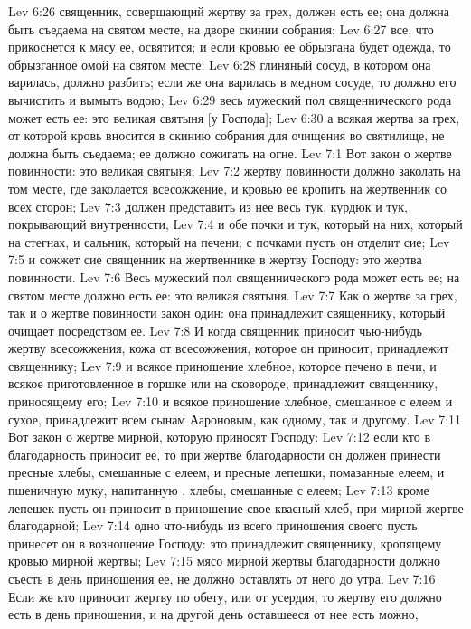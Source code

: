 \vs Lev 6:26 священник, совершающий жертву за грех, должен есть ее; она должна быть съедаема на святом месте, на дворе скинии собрания;
\vs Lev 6:27 все, что прикоснется к мясу ее, освятится; и если кровью ее обрызгана будет одежда, то обрызганное омой на святом месте;
\vs Lev 6:28 глиняный сосуд, в котором она варилась, должно разбить; если же она варилась в медном сосуде, то должно его вычистить и вымыть водою;
\vs Lev 6:29 весь мужеский пол священнического рода может есть ее: это великая святыня [у Господа];
\vs Lev 6:30 а всякая жертва за грех, от которой кровь вносится в скинию собрания для очищения во святилище, не должна быть съедаема; ее должно сожигать на огне.
\vs Lev 7:1 Вот закон о жертве повинности: это великая святыня;
\vs Lev 7:2 жертву повинности должно заколать на том месте, где заколается всесожжение, и кровью ее кропить на жертвенник со всех сторон;
\vs Lev 7:3  должен представить из нее весь тук, курдюк и тук, покрывающий внутренности,
\vs Lev 7:4 и обе почки и тук, который на них, который на стегнах, и сальник, который на печени; с почками пусть он отделит сие;
\vs Lev 7:5 и сожжет сие священник на жертвеннике в жертву Господу: это жертва повинности.
\vs Lev 7:6 Весь мужеский пол священнического рода может есть ее; на святом месте должно есть ее: это великая святыня.
\vs Lev 7:7 Как о жертве за грех, так и о жертве повинности закон один: она принадлежит священнику, который очищает посредством ее.
\vs Lev 7:8 И когда священник приносит чью-нибудь жертву всесожжения, кожа от  всесожжения, которое он приносит, принадлежит священнику;
\vs Lev 7:9 и всякое приношение хлебное, которое печено в печи, и всякое приготовленное в горшке или на сковороде, принадлежит священнику, приносящему его;
\vs Lev 7:10 и всякое приношение хлебное, смешанное с елеем и сухое, принадлежит всем сынам Аароновым, как одному, так и другому.
\rsbpar\vs Lev 7:11 Вот закон о жертве мирной, которую приносят Господу:
\vs Lev 7:12 если кто в благодарность приносит ее, то при жертве благодарности он должен принести пресные хлебы, смешанные с елеем, и пресные лепешки, помазанные елеем, и пшеничную муку, напитанную , хлебы, смешанные с елеем;
\vs Lev 7:13 кроме лепешек пусть он приносит в приношение свое квасный хлеб, при мирной жертве благодарной;
\vs Lev 7:14 одно что-нибудь из всего приношения своего пусть принесет он в возношение Господу: это принадлежит священнику, кропящему кровью мирной жертвы;
\vs Lev 7:15 мясо мирной жертвы благодарности должно съесть в день приношения ее, не должно оставлять от него до утра.
\vs Lev 7:16 Если же кто приносит жертву по обету, или от усердия, то жертву его должно есть в день приношения, и на другой день оставшееся от нее есть можно,
